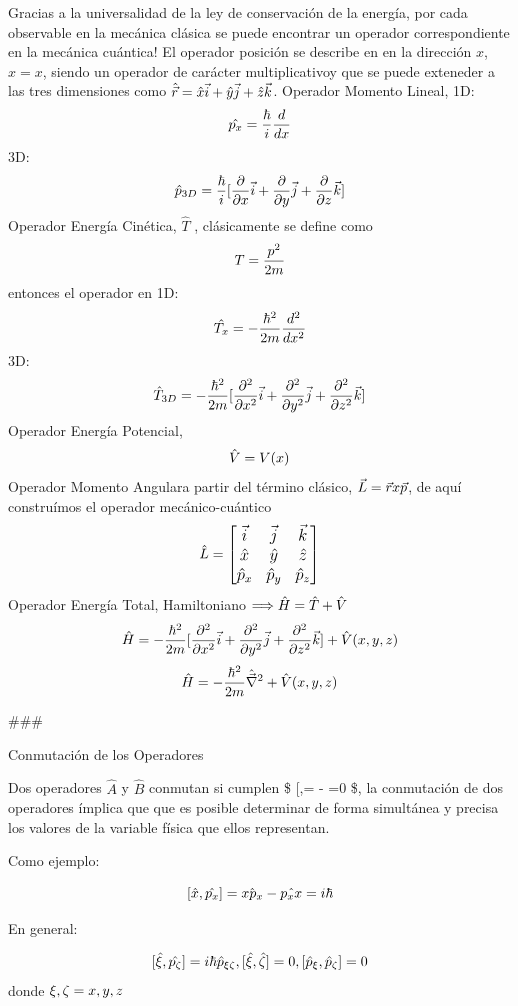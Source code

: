 \documentclass[11pt]{article}
\begin{document}
Gracias a la universalidad de la ley de conservación de la energía, por
cada observable en la mecánica clásica se puede encontrar un operador
correspondiente en la mecánica cuántica! El {operador posición} se
describe en en la dirección \(x\), \(\hat{x}=x\), siendo un operador de
carácter multiplicativoy que se puede exteneder a las tres dimensiones
como
\(\large \hat{\vec r}= \hat{x}\vec i + \hat{y}\vec j + \hat{z}\vec k\).
{Operador Momento Lineal}, 1D:
\[\large \hat{p_x}=\frac{\hbar}{i}\frac{d}{dx}\] 3D:
\[\large \hat{p}_{3D}=\frac{\hbar}{i}[\frac{\partial}{\partial x}\vec i + \frac{\partial}{\partial y}\vec j + \frac{\partial}{\partial z}\vec k]\]
{Operador Energía Cinética}, \(\hat T\) , clásicamente se define como
\[\large T=\frac{p^2}{2m}\] entonces el operador en 1D:
\[\large \hat{T_x}=-\frac{\hbar^2}{2m}\frac{d^2}{dx^2}\] 3D:
\[\large \hat{T}_{3D}=-\frac{\hbar^2}{2m}[\frac{\partial^2}{\partial x^2}\vec i + \frac{\partial^2}{\partial y^2}\vec j + \frac{\partial^2}{\partial z^2}\vec k]\]
{Operador Energía Potencial}, \[\large \hat{V}=V(x)\] {Operador Momento
Angular}a partir del término clásico,
\(\large \vec{L}=\vec r x \vec p\), de aquí construímos el operador
mecánico-cuántico
\[\large \hat{L}=\begin{bmatrix} \vec i &\vec j &\vec k \\ \hat x &\hat y &\hat z \\ \hat{p}_x &\hat{p}_y &\hat{p}_z\end{bmatrix}\]
{Operador Energía Total, Hamiltoniano}
\(\Longrightarrow \large \hat{H}=\hat{T}+\hat{V}\)
\[\large \hat{H}=-\frac{\hbar^2}{2m}[\frac{\partial^2}{\partial x^2}\vec i + \frac{\partial^2}{\partial y^2}\vec j + \frac{\partial^2}{\partial z^2}\vec k] + \hat V(x,y,z)\]
\[\large \hat{H}=-\frac{\hbar^2}{2m}\hat{\vec{\nabla}}^2 + \hat V(x,y,z)\]

    \#\#\#

Conmutación de los Operadores

Dos operadores \(\hat A\) y \(\hat B\) conmutan si cumplen \$
{[},\hat{B}{]}= - =0 \$, la conmutación de dos
operadores ímplica que que es posible determinar de forma simultánea y
precisa los valores de la variable física que ellos representan.

Como ejemplo:

\[ \large [\hat{x},\hat{p_x}] = \hat{x{p_x}}-\hat{{p_x}x}=i\hbar\]

En general:

\[ \large [\hat{\xi},\hat{p_{\zeta}}]=i\hbar \hat{p}_{\xi \zeta}, [\hat{\xi},\hat{\zeta}]=0, [\hat{p}_{\xi},\hat{p}_{\zeta}]=0 \]
donde \(\large \xi, \zeta = x,y,z\)
\end{document}
